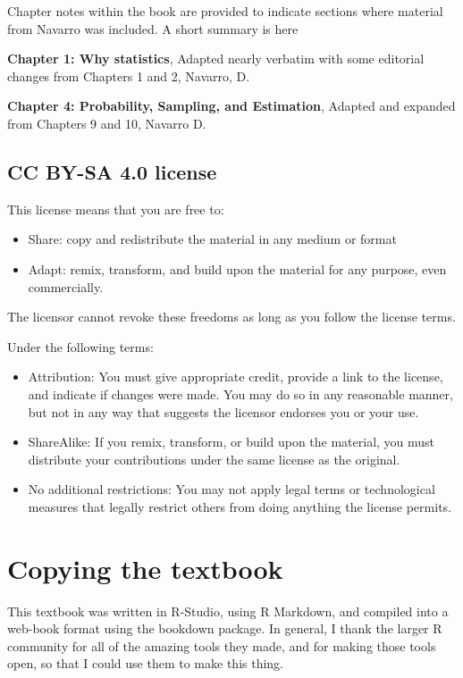 \documentclass[
]{book}
\providecommand{\tightlist}{%
  \setlength{\itemsep}{0pt}\setlength{\parskip}{0pt}}
\begin{document}
Chapter notes within the book are provided to indicate sections where material from Navarro was included. A short summary is here

\textbf{Chapter 1: Why statistics}, Adapted nearly verbatim with some editorial changes from Chapters 1 and 2, Navarro, D.

\textbf{Chapter 4: Probability, Sampling, and Estimation}, Adapted and expanded from Chapters 9 and 10, Navarro D.

\subsection{CC BY-SA 4.0 license}\label{cc-by-sa-4.0-license}

This license means that you are free to:

\begin{itemize}
\tightlist
\item
  Share: copy and redistribute the material in any medium or format
\item
  Adapt: remix, transform, and build upon the material for any purpose, even commercially.
\end{itemize}

The licensor cannot revoke these freedoms as long as you follow the license terms.

Under the following terms:

\begin{itemize}
\tightlist
\item
  Attribution: You must give appropriate credit, provide a link to the license, and indicate if changes were made. You may do so in any reasonable manner, but not in any way that suggests the licensor endorses you or your use.
\item
  ShareAlike: If you remix, transform, or build upon the material, you must distribute your contributions under the same license as the original.
\item
  No additional restrictions: You may not apply legal terms or technological measures that legally restrict others from doing anything the license permits.
\end{itemize}

\section{Copying the textbook}\label{copying-the-textbook}

This textbook was written in R-Studio, using R Markdown, and compiled into a web-book format using the bookdown package. In general, I thank the larger R community for all of the amazing tools they made, and for making those tools open, so that I could use them to make this thing.
\end{document}
